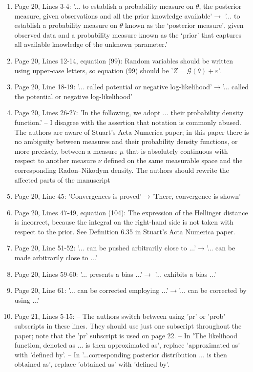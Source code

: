 \documentclass{article}
\begin{document}
\begin{enumerate}[label=(\arabic*)]
		\item Page 20, Lines 3-4: '... to establish a probability measure on $\theta$, the posterior measure, given observations and all the prior knowledge available'$\to$ '... to establish a probability measure on $\theta$ known as the `posterior measure', given observed data and a probability measure known as the `prior' that captures all available knowledge of the unknown parameter.'
		\item Page 20, Lines 12-14, equation (99): Random variables should be written using upper-case letters, so equation (99) should be '$Z=\mathcal{G}(\theta)+\varepsilon$'.
		\item Page 20, Line 18-19: '... called potential or negative log-likelihood'$\to$'... called the potential or negative log-likelihood'
		\item Page 20, Lines 26-27: 'In the following, we adopt ... their probability density function.' -- I disagree with the assertion that notation is commonly abused. The authors are aware of Stuart's Acta Numerica paper; in this paper there is no ambiguity between measures and their probability density functions, or more precisely, between a measure $\mu$ that is absolutely continuous with respect to another measure $\nu$ defined on the same measurable space and the corresponding Radon--Nikodym density. The authors should rewrite the affected parts of the manuscript
		\item Page 20, Line 45: 'Convergences is proved'$\to$'There, convergence is shown'
		\item Page 20, Lines 47-49, equation (104): The expression of the Hellinger distance is incorrect, because the integral on the right-hand side is not taken with respect to the prior. See Definition 6.35 in Stuart's Acta Numerica paper.
		\item Page 20, Line 51-52: '... can be pushed arbitrarily close to ...'$\to$'... can be made arbitrarily close to ...'
		\item Page 20, Lines 59-60: '... presents a bias ...'$\to$ '... exhibits a bias ...'
		\item Page 20, Line 61: '... can be corrected employing ...'$\to$'... can be corrected by using ...'
		\item Page 21, Lines 5-15: -- The authors switch between using 'pr' or 'prob' subscripts in these lines. They should use just one subscript throughout the paper; note that the 'pr' subscript is used on page 22. -- In 'The likelihood function, denoted as ... is then approximated as', replace 'approximated as' with 'defined by'. -- In '...corresponding posterior distribution ... is then obtained as', replace 'obtained as' with 'defined by'.

\end{enumerate}
\end{document}

